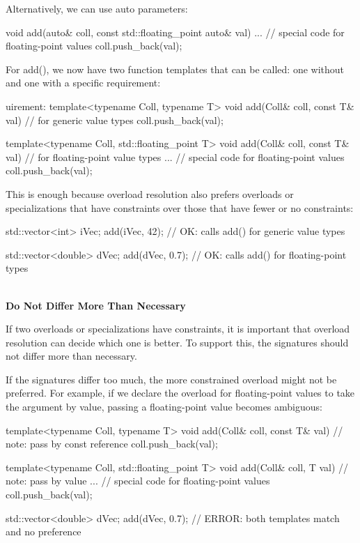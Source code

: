 Alternatively, we can use auto parameters:

\begin{cpp}
void add(auto& coll, const std::floating_point auto& val)
{
	... // special code for floating-point values
	coll.push_back(val);
}
\end{cpp}

For add(), we now have two function templates that can be called: one without and one with a specific requirement:

\begin{cpp}
uirement:
template<typename Coll, typename T>
void add(Coll& coll, const T& val) // for generic value types
{
	coll.push_back(val);
}

template<typename Coll, std::floating_point T>
void add(Coll& coll, const T& val) // for floating-point value types
{
	... // special code for floating-point values
	coll.push_back(val);
}
\end{cpp}

This is enough because overload resolution also prefers overloads or specializations that have constraints over those that have fewer or no constraints:

\begin{cpp}
std::vector<int> iVec;
add(iVec, 42); // OK: calls add() for generic value types

std::vector<double> dVec;
add(dVec, 0.7); // OK: calls add() for floating-point types
\end{cpp}

\noindent
\hspace*{\fill} \\ %
\textbf{Do Not Differ More Than Necessary}

If two overloads or specializations have constraints, it is important that overload resolution can decide which one is better. To support this, the signatures should not differ more than necessary.

If the signatures differ too much, the more constrained overload might not be preferred. For example, if we declare the overload for floating-point values to take the argument by value, passing a floating-point value becomes ambiguous:

\begin{cpp}
template<typename Coll, typename T>
void add(Coll& coll, const T& val) // note: pass by const reference
{
	coll.push_back(val);
}

template<typename Coll, std::floating_point T>
void add(Coll& coll, T val) // note: pass by value
{
	... // special code for floating-point values
	coll.push_back(val);
}

std::vector<double> dVec;
add(dVec, 0.7); // ERROR: both templates match and no preference
\end{cpp}

